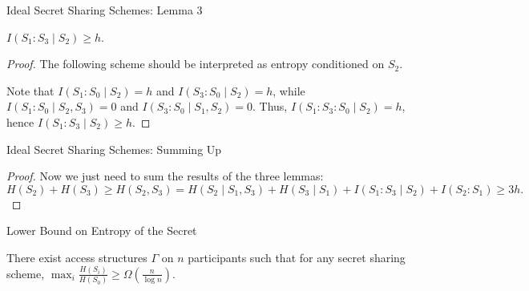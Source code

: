 \documentclass[
handout,
aspectratio=169]{beamer}
\begin{document}
\begin{frame}{Ideal Secret Sharing Schemes: Lemma 3}
    \begin{lemma}\label{lm:secret4:l3}
        $I(S_1 : S_3 \mid S_2) \ge h$.
    \end{lemma}

    \begin{proof}
        The following scheme should be interpreted as entropy conditioned on $S_2$.
        \begin{center}
        \end{center}
        Note that $I(S_1 : S_0 \mid S_2) = h$ and $I(S_3 : S_0 \mid S_2) = h$, while
        $I(S_1 : S_0 \mid S_2, S_3) = 0$ and $I(S_3 : S_0 \mid S_1, S_2) = 0$.
        Thus, $I(S_1 : S_3 : S_0 \mid S_2) = h$, hence $I(S_1 : S_3 \mid S_2) \ge h$.
    \end{proof}
\end{frame}

\begin{frame}{Ideal Secret Sharing Schemes: Summing Up}
   \begin{proof}
            Now we just need to sum the results of the three lemmas:
        \[
        H(S_2) + H(S_3) \ge H(S_2, S_3) = H(S_2 \mid S_1, S_3) + H(S_3 \mid S_1) + I(S_1 : S_3 \mid S_2) +
        I(S_2 : S_1) \ge 3h.
        \]
  \end{proof}
\end{frame}


\begin{frame}{Lower Bound on Entropy of the Secret}
    \begin{theorem}[Csirmaz'94]
        There exist access structures $\Gamma$ on $n$ participants such that for any secret sharing scheme,
        $\max_i \frac{H(S_i)}{H(S_0)} \ge \Omega\left(\frac{n}{\log n}\right)$.
    \end{theorem}
\end{frame}
\end{document}
